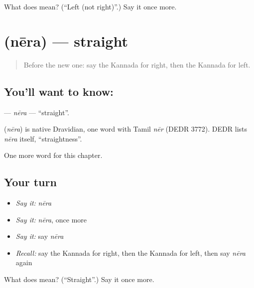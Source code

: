 \begin{tcolorbox}[breakable,colback=teal!4,colframe=teal!35!black,title={Before you move on}]
What does  mean? (\textquotedblleft{}Left (not right)\textquotedblright{}.) Say it once more.
\end{tcolorbox}
\section[\texorpdfstring{\kn{ನೇರ} (nēra)}{ನೇರ (nēra)}]{ (nēra) — straight}

\label{lesson:KA-C107-nera}



\begin{quote}
Before the new one: say the Kannada for right, then the Kannada for left.
\end{quote}

\subsection*{You'll want to know: }
\textbf{} — \emph{nēra} — \textquotedblleft{}straight\textquotedblright{}.

\begin{cousinweb}
\textbf{} (\emph{nēra}) is native Dravidian, one word with Tamil \emph{nēr} (DEDR 3772). DEDR lists \emph{nēra} itself, \textquotedblleft{}straightness\textquotedblright{}.
\end{cousinweb}

\begin{grammarlens}[title={What you've built}]
One more word for this chapter.
\end{grammarlens}

\subsection*{Your turn}
\begin{itemize}
\raggedright
  \item \emph{Say it:} \emph{nēra}
  \item \emph{Say it:} \emph{nēra}, once more
  \item \emph{Say it:} say \emph{nēra}
  \item \emph{Recall:} say the Kannada for right, then the Kannada for left, then say \emph{nēra} again
\end{itemize}

\begin{tcolorbox}[breakable,colback=teal!4,colframe=teal!35!black,title={Before you move on}]
What does  mean? (\textquotedblleft{}Straight\textquotedblright{}.) Say it once more.
\end{tcolorbox}
